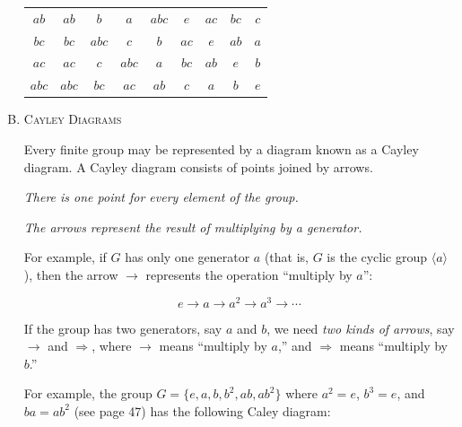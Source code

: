 \documentclass[twoside]{amsart}
\begin{document}
\begin{enumerate}[A.]
\begin{center}
\begin{tabular}{c|cccccccc}
    $ab$ & $ab$ & $b$ & $a$ & $abc$ & $e$ & $ac$ & $bc$ & $c$ \\

    $bc$ & $bc$ & $abc$ & $c$ & $b$ & $ac$ & $e$ & $ab$ & $a$ \\

    $ac$ & $ac$ & $c$ & $abc$ & $a$ & $bc$ & $ab$ & $e$ & $b$ \\

    $abc$ & $abc$ & $bc$ & $ac$ & $ab$ & $c$ & $a$ & $b$ & $e$ 
    \end{tabular}
    \end{center}

    \item \textsc{Cayley Diagrams}

    \noindent Every finite group may be represented by a diagram known
    as a Cayley diagram. A Cayley diagram consists of points joined by arrows.
    \begin{center}
        \textit{There is one point for every element of the group.}
    \end{center}
    \begin{center}
      \textit{The arrows represent the result of multiplying by a generator.}
    \end{center}

    \noindent For example, if $G$ has only one generator $a$ (that is, $G$
    is the cyclic group $\langle a \rangle$), then the arrow $\to$
    represents the operation ``multiply by $a$'':

    \[
       e \to a \to a^2 \to a^3 \to \cdots
    \]

    \noindent If the group has two generators, say $a$ and $b$, we need
    \emph{two kinds of arrows}, say $\to$ and $\Rightarrow$, where 
    $\to$ means ``multiply by $a$,'' and $\Rightarrow$ means
    ``multiply by $b$.''

    For example, the group $G = \{e,a,b,b^2,ab,ab^2\}$ where $a^2=e$,
    $b^3=e$, and $ba=ab^2$ (see page 47) has the following Caley diagram:

    \begin{center}


\end{center}
\end{enumerate}
\end{document}
